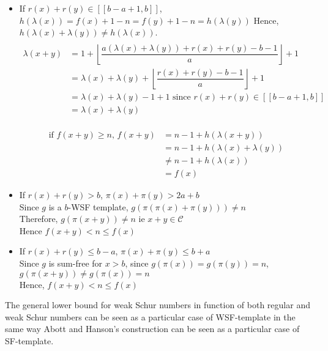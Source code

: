 \begin{itemize}
\item If \(r(x)+r(y) \in [\![b-a+1,b]\!]\), \(h(\lambda(x))=f(x)+1-n=f(y)+1-n=h(\lambda(y))\)
Hence, \(h(\lambda(x)+\lambda(y)) \neq h(\lambda(x))\).
\begin{align*}
 \\\lambda(x+y) & =1+\left\lfloor\dfrac{a(\lambda(x)+\lambda(y))+r(x)+r(y)-b-1}{a}\right\rfloor+1\\
& = \lambda(x)+\lambda(y)+\left\lfloor\dfrac{r(x)+r(y)-b-1}{a}\right\rfloor+1 \\
& = \lambda(x)+\lambda(y) -1 +1 \text{ since } r(x)+r(y) \in [\![b-a+1,b]\!] \\
& =\lambda(x)+\lambda(y)
\end{align*}


\begin{align*}
 \\\text{if \(f(x+y) \geqslant n\), }f(x+y) & =n-1+h(\lambda(x+y))\\
& =n-1+h(\lambda(x)+\lambda(y)) \\
& \neq n-1+h(\lambda(x))\\
& =f(x)
\end{align*}


\item If \(r(x)+r(y)>b\), \(\pi(x)+\pi(y)>2a+b\)
\\Since \(g\) is a \(b\)-WSF template, \(g(\pi(\pi(x)+\pi(y))) \neq n\)
\\Therefore, \(g(\pi(x+y)) \neq n\) ie \(x+y \in \mathcal{C}\)
\\Hence \(f(x+y) <n\leqslant f(x)\)
\item If \(r(x)+r(y) \leqslant b - a\), \(\pi(x)+\pi(y)\leqslant b+a\)
\\Since \(g\) is sum-free for \(x>b\), since \(g(\pi(x)) = g(\pi(y))=n\), \(g(\pi(x+y)) \neq g(\pi(x))=n\)
\\Hence, \(f(x+y) <n\leqslant f(x)\)
\end{itemize}

\begin{corollary}
The general lower bound for weak Schur numbers in function of both regular and weak Schur numbers can be seen as a particular
case of WSF-template in the same way Abott and Hanson's construction can be seen as a particular case of SF-template.
\end{corollary}

